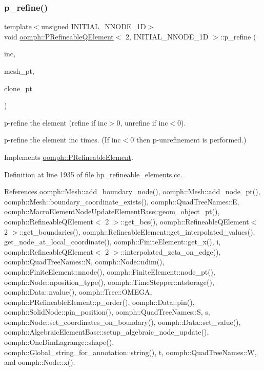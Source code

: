 \subsubsection{\texorpdfstring{p\+\_\+refine()}{p\_refine()}}
{\footnotesize\ttfamily template$<$unsigned I\+N\+I\+T\+I\+A\+L\+\_\+\+N\+N\+O\+D\+E\+\_\+1D$>$ \\
void \hyperlink{classoomph_1_1PRefineableQElement}{oomph\+::\+P\+Refineable\+Q\+Element}$<$ 2, I\+N\+I\+T\+I\+A\+L\+\_\+\+N\+N\+O\+D\+E\+\_\+1D $>$\+::p\+\_\+refine (\begin{DoxyParamCaption}\item[{const int \&}]{inc,  }\item[{\hyperlink{classoomph_1_1Mesh}{Mesh} $\ast$const \&}]{mesh\+\_\+pt,  }\item[{\hyperlink{classoomph_1_1GeneralisedElement}{Generalised\+Element} $\ast$const \&}]{clone\+\_\+pt }\end{DoxyParamCaption})\hspace{0.3cm}{\ttfamily [virtual]}}



p-\/refine the element (refine if inc$>$0, unrefine if inc$<$0). 

p-\/refine the element inc times. (If inc$<$0 then p-\/unrefinement is performed.) 

Implements \hyperlink{classoomph_1_1PRefineableElement_a706db9352965197a215405f620b3cedc}{oomph\+::\+P\+Refineable\+Element}.



Definition at line 1935 of file hp\+\_\+refineable\+\_\+elements.\+cc.



References oomph\+::\+Mesh\+::add\+\_\+boundary\+\_\+node(), oomph\+::\+Mesh\+::add\+\_\+node\+\_\+pt(), oomph\+::\+Mesh\+::boundary\+\_\+coordinate\+\_\+exists(), oomph\+::\+Quad\+Tree\+Names\+::E, oomph\+::\+Macro\+Element\+Node\+Update\+Element\+Base\+::geom\+\_\+object\+\_\+pt(), oomph\+::\+Refineable\+Q\+Element$<$ 2 $>$\+::get\+\_\+bcs(), oomph\+::\+Refineable\+Q\+Element$<$ 2 $>$\+::get\+\_\+boundaries(), oomph\+::\+Refineable\+Element\+::get\+\_\+interpolated\+\_\+values(), get\+\_\+node\+\_\+at\+\_\+local\+\_\+coordinate(), oomph\+::\+Finite\+Element\+::get\+\_\+x(), i, oomph\+::\+Refineable\+Q\+Element$<$ 2 $>$\+::interpolated\+\_\+zeta\+\_\+on\+\_\+edge(), oomph\+::\+Quad\+Tree\+Names\+::N, oomph\+::\+Node\+::ndim(), oomph\+::\+Finite\+Element\+::nnode(), oomph\+::\+Finite\+Element\+::node\+\_\+pt(), oomph\+::\+Node\+::nposition\+\_\+type(), oomph\+::\+Time\+Stepper\+::ntstorage(), oomph\+::\+Data\+::nvalue(), oomph\+::\+Tree\+::\+O\+M\+E\+GA, oomph\+::\+P\+Refineable\+Element\+::p\+\_\+order(), oomph\+::\+Data\+::pin(), oomph\+::\+Solid\+Node\+::pin\+\_\+position(), oomph\+::\+Quad\+Tree\+Names\+::S, s, oomph\+::\+Node\+::set\+\_\+coordinates\+\_\+on\+\_\+boundary(), oomph\+::\+Data\+::set\+\_\+value(), oomph\+::\+Algebraic\+Element\+Base\+::setup\+\_\+algebraic\+\_\+node\+\_\+update(), oomph\+::\+One\+Dim\+Lagrange\+::shape(), oomph\+::\+Global\+\_\+string\+\_\+for\+\_\+annotation\+::string(), t, oomph\+::\+Quad\+Tree\+Names\+::W, and oomph\+::\+Node\+::x().

